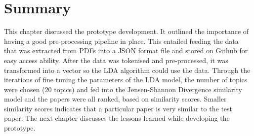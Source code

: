 \section{Summary}
This chapter discussed the prototype development. It outlined the importance of having a good pre-processing pipeline in place. This entailed feeding the data that was extracted from PDFs into a JSON format file and stored on Github for easy access ability. After the data was tokenised and pre-processed, it was transformed into a vector so the LDA algorithm could use the data. Through the iterations of fine tuning the parameters of the LDA model, the number of topics were chosen (20 topics) and fed into the Jensen-Shannon Divergence similarity model and the papers were all ranked, based on similarity scores. Smaller similarity scores indicates that a particular paper is very similar to the test paper. The next chapter discusses the lessons learned while developing the prototype.
